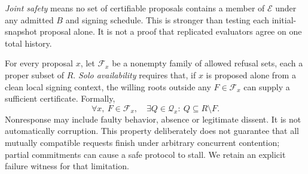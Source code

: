 \documentclass[11pt,a4paper]{article}
\theoremstyle{definition}\newtheorem{definition}{Definition}
\newcommand{\E}{\mathcal E}\newcommand{\B}{\mathcal B}\newcommand{\F}{\mathcal F}\newcommand{\Q}{\mathcal Q}
\begin{document}
\emph{Joint safety} means no set of certifiable proposals contains a member of $\E$ under any admitted $B$ and signing schedule. This is stronger than testing each initial-snapshot proposal alone. It is not a proof that replicated evaluators agree on one total history.

For every proposal $x$, let $\F_x$ be a nonempty family of allowed refusal sets, each a proper subset of $R$. \emph{Solo availability} requires that, if $x$ is proposed alone from a clean local signing context, the willing roots outside any $F\in\F_x$ can supply a sufficient certificate. Formally,
\begin{equation}
\forall x,\ F\in\F_x,\quad \exists Q\in\Q_x:\ Q\subseteq R\setminus F.
\label{eq:solo}
\end{equation}
Nonresponse may include faulty behavior, absence or legitimate dissent. It is not automatically corruption. This property deliberately does not guarantee that all mutually compatible requests finish under arbitrary concurrent contention; partial commitments can cause a safe protocol to stall. We retain an explicit failure witness for that limitation.
\end{document}

